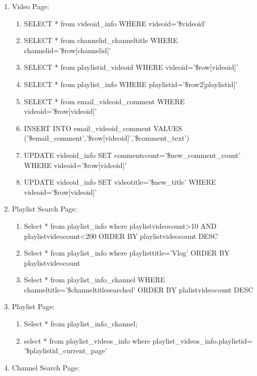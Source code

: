 \documentclass[10pt]{article}
\begin{document}
\begin{enumerate}
\begin{enumerate}
\begin{enumerate}
				\item SELECT videoid,videotitle,viewcount FROM videoid\_info WHERE viewcount\textgreater=0 AND viewcount\textgreater200 AND duration\textless300 ORDER BY viewcount DESC
			\end{enumerate}
			\item Video Page:
			\begin{enumerate}
				\item SELECT * from videoid\_info WHERE videoid='\$videoid'
				\item SELECT * from channelid\_channeltitle WHERE channelid='\$row[channelid]'
				\item SELECT * from playlistid\_videoid WHERE videoid='\$row[videoid]'
				\item SELECT * from playlist\_info WHERE playlistid='\$row2[playlistid]'
				\item SELECT * from email\_videoid\_comment WHERE videoid='\$row[videoid]'
				\item INSERT INTO email\_videoid\_comment VALUES ('\$email\_comment','\$row[videoid]','\$comment\_text')
				\item UPDATE videoid\_info SET commentcount='\$new\_comment\_count' WHERE videoid='\$row[videoid]'
				\item UPDATE videoid\_info SET videotitle='\$new\_title' WHERE videoid='\$row[videoid]'
			\end{enumerate}
			\item Playlist Search Page:
			\begin{enumerate}
				\item Select * from playlist\_info where playlistvideocount\textgreater10 AND playlistvideocount\textless200
				ORDER BY playlistvideocount DESC
				\item Select * from playlist\_info where playlisttitle=’Vlog’ ORDER BY playlistvideocount
				\item Select * from playlist\_info\_channel WHERE channeltitle=’\$channeltitlesearched’ ORDER BY plalistvideocount DESC
			\end{enumerate}
			\item Playlist Page:
			\begin{enumerate}
				\item Select * from playlist\_info\_channel;
				\item select * from playlist\_videos\_info where playlist\_videos\_info.playlistid= ’\$playlistid\_current\_page’
			\end{enumerate}
			\item Channel Search Page:

\end{enumerate}
\end{enumerate}
\end{document}
